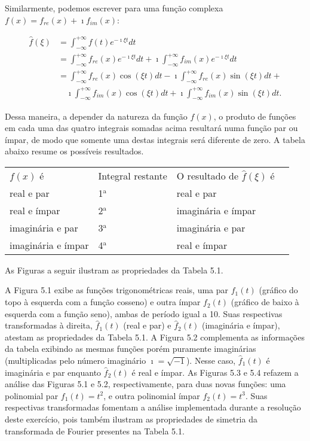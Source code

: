Similarmente, podemos escrever para uma função complexa $f(x) = f_{re}(x) + \imath f_{im}(x)$:

\begin{align*}
\hat{f}(\xi) &= \int_{-\infty}^{+\infty} f(t) e^{-\imath \xi t}d t \\[10pt]
 &= \int_{-\infty}^{+\infty} f_{re}(x) e^{-\imath \xi t}d t  + \imath \int_{-\infty}^{+\infty}  f_{im}(x) e^{-\imath \xi t}d t \\[10pt]
 &= \int_{-\infty}^{+\infty} f_{re}(x) \cos(\xi t)d t  - \imath\int_{-\infty}^{+\infty}  f_{re}(x) \sin(\xi t)d t + \\[10pt]
 & \quad \imath \int_{-\infty}^{+\infty} f_{im}(x) \cos(\xi t)d t + \imath \int_{-\infty}^{+\infty}  f_{im}(x) \sin(\xi t)d t.
\end{align*}

Dessa maneira, a depender da natureza da função $f(x)$, o produto de funções em cada uma das quatro integrais somadas acima resultará numa função par ou ímpar, de modo que somente uma destas integrais será diferente de zero. A tabela abaixo resume os possíveis resultados.

\begin{table*}[ht!]
\centering
{}
\begin{tabular}{@{}l l l l@{}}
\toprule
$f(x)$ é & Integral restante & O resultado de $\hat{f}(\xi)$ é \\
\cmidrule{1-3}
real e par & 1$^{\text{a}}$  & real e par \\
real e ímpar & 2$^{\text{a}}$ & imaginária e ímpar \\
imaginária e par & 3$^{\text{a}}$ & imaginária e par \\
imaginária e ímpar & 4$^{\text{a}}$ & real e ímpar \\
\bottomrule
\end{tabular}
\label{tab:1}
\end{table*}

As Figuras a seguir ilustram as propriedades da Tabela 5.1. 

A Figura 5.1 exibe as funções trigonométricas reais, uma par $f_{1}(t)$ (gráfico do topo à esquerda com a função cosseno) e outra ímpar  $f_{2}(t)$ (gráfico de baixo à esquerda com a função seno), ambas de período igual a 10. Suas respectivas transformadas à direita, $\hat{f}_{1}(t)$ (real e par) e  $\hat{f}_{2}(t)$ (imaginária e ímpar), atestam as propriedades da Tabela 5.1. A Figura 5.2 complementa as informações da tabela exibindo as mesmas funções porém  puramente imaginárias (multiplicadas pelo número imaginário $\imath = \sqrt{-1}$). Nesse caso, $\hat{f}_{1}(t)$ é imaginária e par enquanto $\hat{f}_{2}(t)$ é real e ímpar. As Figuras 5.3 e 5.4 refazem a análise das Figuras 5.1 e 5.2, respectivamente, para duas novas funções: uma polinomial par $f_{1}(t) = t^{2}$, e outra polinomial ímpar $f_{2}(t) = t^{3}$. Suas respectivas transformadas fomentam a análise implementada durante a resolução deste exercício, pois também ilustram as propriedades de simetria da transformada de Fourier presentes na Tabela 5.1.

